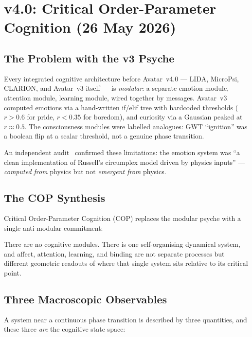 \documentclass[11pt,a4paper]{article}
\begin{document}
\section{v4.0: Critical Order-Parameter Cognition (26 May 2026)}

\subsection{The Problem with the v3 Psyche}

Every integrated cognitive architecture before Avatar~v4.0 --- LIDA, MicroPsi, CLARION,
and Avatar~v3 itself --- is \emph{modular}: a separate emotion module, attention module,
learning module, wired together by messages. Avatar~v3 computed emotions via a
hand-written if/elif tree with hardcoded thresholds ($r > 0.6$ for pride, $r < 0.35$ for
boredom), and curiosity via a Gaussian peaked at $r \approx 0.5$. The consciousness
modules were labelled analogues: GWT ``ignition'' was a boolean flip at a scalar threshold,
not a genuine phase transition.

An independent audit~\cite{audit2026} confirmed these limitations: the emotion system was
``a clean implementation of Russell's circumplex model driven by physics inputs'' ---
\emph{computed from} physics but not \emph{emergent from} physics.

\subsection{The COP Synthesis}

Critical Order-Parameter Cognition (COP) replaces the modular psyche with a single
anti-modular commitment:

\begin{tcolorbox}[highlight,title={The Core Thesis}]
There are no cognitive modules. There is one self-organising dynamical system, and
affect, attention, learning, and binding are not separate processes but different
geometric readouts of where that single system sits relative to its critical point.
\end{tcolorbox}

\subsection{Three Macroscopic Observables}

A system near a continuous phase transition is described by three quantities,
and these three \emph{are} the cognitive state space:
\end{document}
